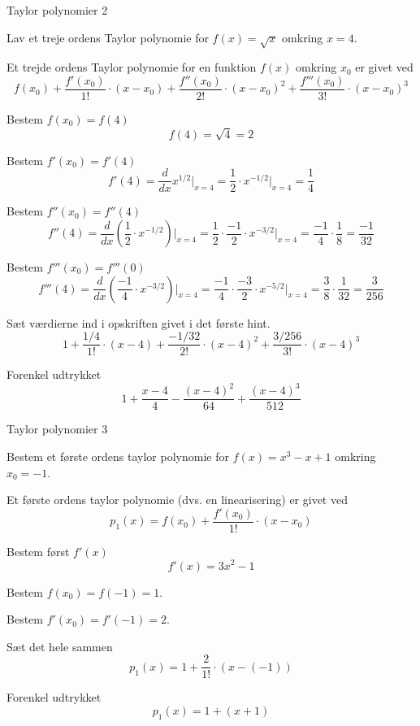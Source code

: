 \documentclass{article}
\begin{document}
\begin{exercise}{Taylor polynomier 2}

Lav et treje ordens Taylor polynomie for $f(x) = \sqrt{x}$
omkring $x = 4$.


\hint
Et trejde ordens Taylor polynomie for en funktion $f(x)$
omkring $x_0$ er givet ved
\[
f(x_0) + \frac{f'(x_0)}{1!} \cdot (x - x_0) + \frac{f''(x_0)}{2!} \cdot (x - x_0)^2 + \frac{f'''(x_0)}{3!} \cdot (x - x_0)^3
\]

\hint
Bestem $f(x_0) = f(4)$
\[
f(4) = \sqrt{4} = 2
\]

\hint
Bestem $f'(x_0) = f'(4)$
\[
f'(4) = \frac{d}{dx} x^{1/2} \Big|_{x = 4} = \frac{1}{2} \cdot x^{-1/2} \Big|_{x = 4} = \frac{1}{4}
\]

\hint
Bestem $f''(x_0) = f''(4)$
\[
f''(4) = \frac{d}{dx} \left( \frac{1}{2} \cdot x^{-1/2} \right) \Big|_{x = 4} = \frac{1}{2} \cdot \frac{-1}{2} \cdot x^{-3/2} \Big|_{x = 4} = \frac{-1}{4} \cdot \frac{1}{8} = \frac{-1}{32}
\]

\hint
Bestem $f'''(x_0) = f'''(0)$
\[
f'''(4) = \frac{d}{dx} \left( \frac{-1}{4} \cdot x^{-3/2} \right) \Big|_{x = 4} = \frac{-1}{4} \cdot \frac{-3}{2} \cdot x^{-5/2} \Big|_{x = 4} = \frac{3}{8} \cdot \frac{1}{32} = \frac{3}{256} 
\]

\hint
Sæt værdierne ind i opskriften givet i det første hint.
\[
1 + \frac{1/4}{1!} \cdot (x - 4) + \frac{-1 / 32}{2!} \cdot (x - 4)^2 + \frac{3 / 256}{3!}  \cdot (x - 4)^3
\]

\hint
Forenkel udtrykket
\[
1 + \frac{x - 4}{4} - \frac{(x - 4)^2}{64} + \frac{(x - 4)^3}{512}
\]

\end{exercise}

\begin{exercise}{Taylor polynomier 3}

Bestem et første ordens taylor polynomie for $f(x) = x^3 - x + 1$
omkring $x_0 = -1$.


\hint
Et første ordens taylor polynomie (dvs. en linearisering) 
er givet ved
\[
p_1(x) = f(x_0) + \frac{f'(x_0)}{1!} \cdot (x - x_0)
\]


\hint
Bestem først $f'(x)$
\[
f'(x) = 3x^2 - 1
\]

\hint
Bestem $f(x_0) = f(-1) = 1$.

\hint
Bestem $f'(x_0) = f'(-1) = 2$.

\hint
Sæt det hele sammen
\[
p_1(x) = 1 + \frac{2}{1!} \cdot \left(x - (-1)\right)
\]

\hint
Forenkel udtrykket
\[
p_1(x) = 1 + (x + 1)
\]


\end{exercise}
\end{document}
